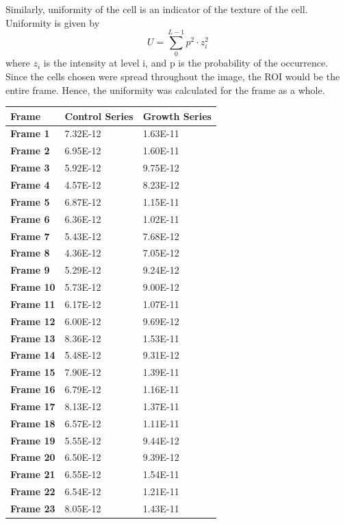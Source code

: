 \documentclass{article}
\begin{document}
\clearpage
Similarly, uniformity of the cell is an indicator of the texture of the cell. Uniformity is given by 
\begin{equation*}
    \displaystyle{U} = \sum_0^{L-1}p^2 \cdot z_i^2
\end{equation*}
where $z_i$ is the intensity at level i, and p is the probability of the occurrence. 
Since the cells chosen were spread throughout the image, the ROI would be the entire frame. Hence, the uniformity was calculated for the frame as a whole. 
\begin{table}[h!]
    \centering
    \begin{tabular}{ |p{3cm}||p{3cm}|p{3cm}|  }
     \hline Frame & Control Series & Growth Series\\
 \hline 
\textbf{Frame 1} & 7.32E-12 & 1.63E-11\\
\textbf{Frame 2} & 6.95E-12 & 1.60E-11\\
\textbf{Frame 3} & 5.92E-12 & 9.75E-12\\
\textbf{Frame 4} & 4.57E-12 & 8.23E-12\\
\textbf{Frame 5} & 6.87E-12 & 1.15E-11\\
\textbf{Frame 6} & 6.36E-12 & 1.02E-11\\
\textbf{Frame 7} & 5.43E-12 & 7.68E-12\\
\textbf{Frame 8} & 4.36E-12 & 7.05E-12\\
\textbf{Frame 9} & 5.29E-12 & 9.24E-12\\
\textbf{Frame 10} & 5.73E-12 & 9.00E-12\\
\textbf{Frame 11} & 6.17E-12 & 1.07E-11\\
\textbf{Frame 12} & 6.00E-12 & 9.69E-12\\
\textbf{Frame 13} & 8.36E-12 & 1.53E-11\\
\textbf{Frame 14} & 5.48E-12 & 9.31E-12\\
\textbf{Frame 15} & 7.90E-12 & 1.39E-11\\
\textbf{Frame 16} & 6.79E-12 & 1.16E-11\\
\textbf{Frame 17} & 8.13E-12 & 1.37E-11\\
\textbf{Frame 18} & 6.57E-12 & 1.11E-11\\
\textbf{Frame 19} & 5.55E-12 & 9.44E-12\\
\textbf{Frame 20} & 6.50E-12 & 9.39E-12\\
\textbf{Frame 21} & 6.55E-12 & 1.54E-11\\
\textbf{Frame 22} & 6.54E-12 & 1.21E-11\\
\textbf{Frame 23} & 8.05E-12 & 1.43E-11\\

\end{tabular}
\end{table}
\end{document}
